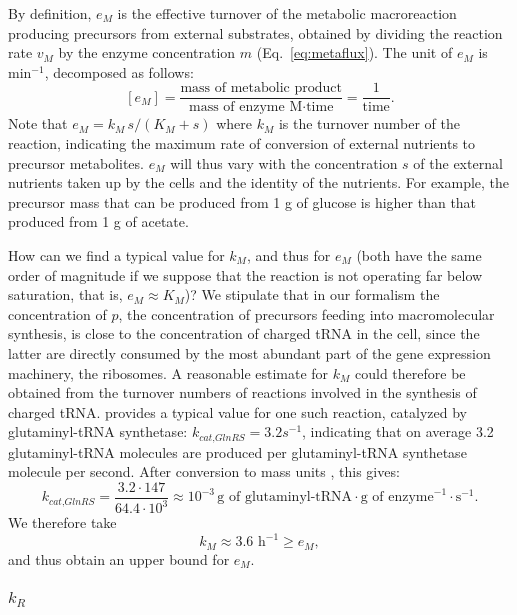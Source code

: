 By definition, $e_M$ is the effective turnover of the metabolic macroreaction producing precursors from external substrates, obtained by dividing the reaction rate $v_M$ by the enzyme concentration $m$ (Eq.~\ref{eq:metaflux}).
The unit of $e_M$ is min$^{-1}$,  decomposed as follows:
\[
[e_M]  = \frac{\text{mass of metabolic product}}{\text{mass of enzyme M}\cdot \text{time}} = \frac{1}{\text{time}}.
\]
Note that $e_M = k_M\, s / (K_M + s)$ where $k_M$ is the turnover number of the reaction, indicating the maximum rate of conversion of external nutrients to precursor metabolites. 
$e_M$ will thus vary with the concentration $s$ of the external nutrients taken up by the cells and the identity of the nutrients. 
For example, the precursor mass that can be produced from 1 g of glucose is higher than that produced from 1 g of acetate.

How can we find a typical value for $k_M$, and thus for $e_M$ (both have the same order of magnitude if we suppose that the reaction is not operating far below saturation, that is, $e_M \approx K_M$)?
We stipulate that in our formalism the concentration of $p$, the concentration of precursors feeding into macromolecular synthesis, is close to the concentration of charged tRNA in the cell, since the latter are directly consumed by the most abundant part of the gene expression machinery, the ribosomes.
A reasonable estimate for $k_M$ could therefore be obtained from the turnover numbers of reactions involved in the synthesis of charged tRNA.
\cite{uter_longrange_2004} provides a typical value for one such reaction, catalyzed by glutaminyl-tRNA synthetase: $k_{\textit{cat,GlnRS}} = 3.2 s^{-1}$, indicating that on average 3.2 glutaminyl-tRNA molecules are produced per glutaminyl-tRNA synthetase molecule per second. 
After conversion to mass units \cite{freist_glutaminyltrna_1997}, this gives:
\[
k_{\textit{cat,GlnRS}} = \frac{3.2 \cdot 147}{64.4 \cdot 10^ 3} \approx 10^{-3} \, \text{g of glutaminyl-tRNA} \cdot \text{g of enzyme}^{-1} \cdot \text{s}^{-1}.
\]
We therefore take
\[
k_M \approx 3.6 \text{ h}^{-1} \geq e_M,
\]
and thus obtain an upper bound for $e_M$.

\subsubsection{\texorpdfstring{$k_R$}{kR}}

